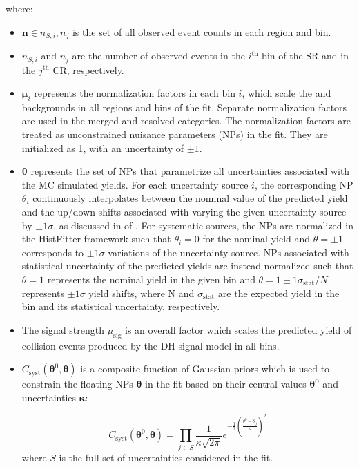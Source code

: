 where:

\begin{itemize}
    \item \(\boldsymbol{n}\in{n_{S,i}, n_j}\) is the set of all observed event counts in each region and bin.
    \item \(n_{S,i}\) and \(n_j\) are the number of observed events in the \(i^\text{th}\) bin of the SR and in the \(j^\text{th}\) CR, respectively.
    \item \(\boldsymbol{\mu}_i\) represents the normalization factors in each bin \(i\), which scale the \wjets and \ttbar backgrounds in all regions and bins of the fit. Separate normalization factors are used in the merged and resolved categories. The normalization factors are treated as unconstrained nuisance parameters (NPs) in the fit. They are initialized as 1, with an uncertainty of \(\pm1\).  
    \item \(\boldsymbol{\theta}\) represents the set of NPs that parametrize all uncertainties associated with the MC simulated yields. For each uncertainty source \(i\), the corresponding NP \(\theta_i\) continuously interpolates between the nominal value of the predicted yield and the up/down shifts associated with varying the given uncertainty source by \(\pm1\sigma\), as discussed in  of . For systematic sources, the NPs are normalized in the HistFitter framework such that \(\theta_i=0\) for the nominal yield and \(\theta=\pm1\) corresponds to \(\pm1\sigma\) variations of the uncertainty source. NPs associated with statistical uncertainty of the predicted yields are instead normalized such that \(\theta=1\) represents the nominal yield in the given bin and \(\theta=1\pm1\sigma_\text{stat}/N\) represents \(\pm1\sigma\) yield shifts, where N and \(\sigma_\text{stat}\) are the expected yield in the bin and its statistical uncertainty, respectively. 
    \item The signal strength \(\mu_\text{sig}\) is an overall factor which scales the predicted yield of collision events produced by the DH signal model in all bins.
    \item \(C_\text{syst}(\boldsymbol{\theta}^0, \boldsymbol{\theta})\) is a composite function of Gaussian priors which is used to constrain the floating NPs \(\boldsymbol{\theta}\) in the fit based on their central values \(\boldsymbol{\theta^0}\) and uncertainties \(\boldsymbol{\kappa}\):

    \begin{equation}
    \label{eq:gaussian_np}
    C_\text{syst}(\boldsymbol{\theta}^0, \boldsymbol{\theta})= \prod_{j\in S} \frac{1}{\kappa\sqrt{2\pi}}e^{-\frac{1}{2}(\frac{\theta^0_j-\theta_j}{\kappa})^2}
    \end{equation}
    \noindent where \(S\) is the full set of uncertainties considered in the fit.
    

\end{itemize}
